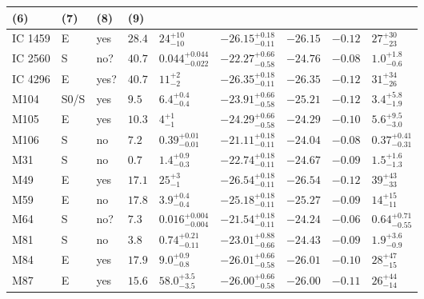 \begin{table*}
\begin{center}
\begin{tabular}{lllllllll}
\multicolumn{1}{l}{(6)} &                             
\multicolumn{1}{l}{(7)} &                             
\multicolumn{1}{l}{(8)} &                             
\multicolumn{1}{l}{(9)} \\                         
\hline                                                
IC 1459  &  E  &  yes   &  $28.4$  &  $24_{-10}^{+10}$   &  $-26.15_{-0.11}^{+0.18}$   &  $-26.15$   &  $-0.12$  &  $27_{-23}^{+30}$   \\ 
IC 2560  &  S  &  no?  &  $40.7$  &  $0.044_{-0.022}^{+0.044}$   &  $-22.27_{-0.58}^{+0.66}$   &  $-24.76$   &  $-0.08$  &  $1.0_{-0.6}^{+1.8}$   \\ 
IC 4296  &  E  &  yes?  &  $40.7$  &  $11_{-2}^{+2}$   &  $-26.35_{-0.11}^{+0.18}$   &  $-26.35$   &  $-0.12$  &  $31_{-26}^{+34}$   \\ 
M104  &  S0/S  &  yes   &  $9.5$  &  $6.4_{-0.4}^{+0.4}$   &  $-23.91_{-0.58}^{+0.66}$   &  $-25.21$   &  $-0.12$  &  $3.4_{-1.9}^{+5.8}$   \\ 
M105  &  E  &  yes   &  $10.3$  &  $4_{-1}^{+1}$   &  $-24.29_{-0.58}^{+0.66}$   &  $-24.29$   &  $-0.10$  &  $5.6_{-3.0}^{+9.5}$   \\ 
M106  &  S  &  no   &  $7.2$  &  $0.39_{-0.01}^{+0.01}$   &  $-21.11_{-0.11}^{+0.18}$   &  $-24.04$   &  $-0.08$  &  $0.37_{-0.31}^{+0.41}$   \\ 
M31  &  S  &  no   &  $0.7$  &  $1.4_{-0.3}^{+0.9}$   &  $-22.74_{-0.11}^{+0.18}$   &  $-24.67$   &  $-0.09$  &  $1.5_{-1.3}^{+1.6}$   \\ 
M49  &  E  &  yes   &  $17.1$  &  $25_{-1}^{+3}$   &  $-26.54_{-0.11}^{+0.18}$   &  $-26.54$   &  $-0.12$  &  $39_{-33}^{+43}$   \\ 
M59  &  E  &  no   &  $17.8$  &  $3.9_{-0.4}^{+0.4}$   &  $-25.18_{-0.11}^{+0.18}$   &  $-25.27$   &  $-0.09$  &  $14_{-11}^{+15}$   \\ 
M64  &  S  &  no?  &  $7.3$  &  $0.016_{-0.004}^{+0.004}$   &  $-21.54_{-0.11}^{+0.18}$   &  $-24.24$   &  $-0.06$  &  $0.64_{-0.55}^{+0.71}$   \\ 
M81  &  S  &  no   &  $3.8$  &  $0.74_{-0.11}^{+0.21}$   &  $-23.01_{-0.66}^{+0.88}$   &  $-24.43$   &  $-0.09$  &  $1.9_{-0.9}^{+3.6}$   \\ 
M84  &  E  &  yes   &  $17.9$  &  $9.0_{-0.8}^{+0.9}$   &  $-26.01_{-0.58}^{+0.66}$   &  $-26.01$   &  $-0.10$  &  $28_{-15}^{+47}$   \\ 
M87  &  E  &  yes   &  $15.6$  &  $58.0_{-3.5}^{+3.5}$   &  $-26.00_{-0.58}^{+0.66}$   &  $-26.00$   &  $-0.11$  &  $26_{-14}^{+44}$   \\ 

\end{tabular}
\end{center}
\end{table*}
